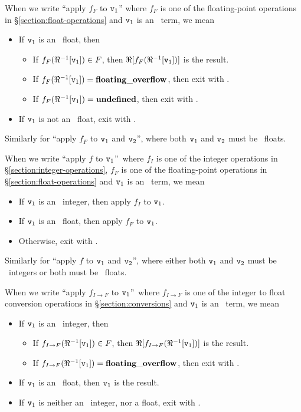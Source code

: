 When we write ``apply $f_F$ to ${\tt{\sl v}}_1$'' where
$f_F$ is one of the floating-point operations in
\S\ref{section:float-operations} and ${\tt{\sl v}}_1$ is an \Erlang\ term, we mean
\begin{itemize}
\item If ${\tt{\sl v}}_1$ is an \Erlang\ float, then
\begin{itemize}
\item If $f_F(\Re^{-1}[{\tt{\sl v}}_1])\in F$, then $\Re[f_F(\Re^{-1}[{\tt{\sl v}}_1])]$
is the result.
\item If $f_F(\Re^{-1}[{\tt{\sl v}}_1])={\bf floating\_overflow}$, then exit with .
\item If $f_F(\Re^{-1}[{\tt{\sl v}}_1])={\bf undefined}$, then exit with .
\end{itemize}
\item If ${\tt{\sl v}}_1$ is not an \Erlang\ float, exit with \T{\badarith}.
\end{itemize}
Similarly for ``apply $f_F$ to ${\tt{\sl v}}_1$ and ${\tt{\sl v}}_2$'', where both
${\tt{\sl v}}_1$ and ${\tt{\sl v}}_2$ must be \Erlang\ floats.

When we write ``apply $f$ to ${\tt{\sl v}}_1$''\ where $f_I$ is one of the
integer operations in
\S\ref{section:integer-operations}, $f_F$ is one of the floating-point operations in
\S\ref{section:float-operations} and ${\tt{\sl v}}_1$ is an \Erlang\ term, we mean
\begin{itemize}
\item If ${\tt{\sl v}}_1$ is an \Erlang\ integer, then apply $f_I$ to
${\tt{\sl v}}_1$.
\item If ${\tt{\sl v}}_1$ is an \Erlang\ float, then apply $f_F$ to
${\tt{\sl v}}_1$.
\item Otherwise, exit with .
\end{itemize}
Similarly for ``apply $f$ to ${\tt{\sl v}}_1$ and ${\tt{\sl v}}_2$'', where either both
${\tt{\sl v}}_1$ and ${\tt{\sl v}}_2$ must be \Erlang\ integers or both must be
\Erlang\ floats.

When we write ``apply $f_{I\to F}$ to ${\tt{\sl v}}_1$''\ where
$f_{I\to F}$ is one of the integer to float conversion operations in
\S\ref{section:conversions} and ${\tt{\sl v}}_1$ is an
\Erlang\ term, we mean
\begin{itemize}
\item If ${\tt{\sl v}}_1$ is an \Erlang\ integer, then
\begin{itemize}
\item If $f_{I\to F}(\Re^{-1}[{\tt{\sl v}}_1])\in F$, then $\Re[f_{I\to F}(\Re^{-1}[{\tt{\sl v}}_1])]$ is the result.
\item If $f_{I\to F}(\Re^{-1}[{\tt{\sl v}}_1])={\bf floating\_overflow}$, then exit with .
\end{itemize}
\item If ${\tt{\sl v}}_1$ is an \Erlang\ float, then ${\tt{\sl v}}_1$ is the result.
\item If ${\tt{\sl v}}_1$ is neither an \Erlang\ integer, nor a float, exit with .
\end{itemize}

